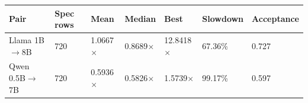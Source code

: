 \begin{tabular}{lllllll}
\toprule
Pair & Spec rows & Mean & Median & Best & Slowdown & Acceptance \\
\midrule
Llama 1B$\rightarrow$8B & 720 & 1.0667$\times$ & 0.8689$\times$ & 12.8418$\times$ & 67.36\% & 0.727 \\
Qwen 0.5B$\rightarrow$7B & 720 & 0.5936$\times$ & 0.5826$\times$ & 1.5739$\times$ & 99.17\% & 0.597 \\
\bottomrule
\end{tabular}
